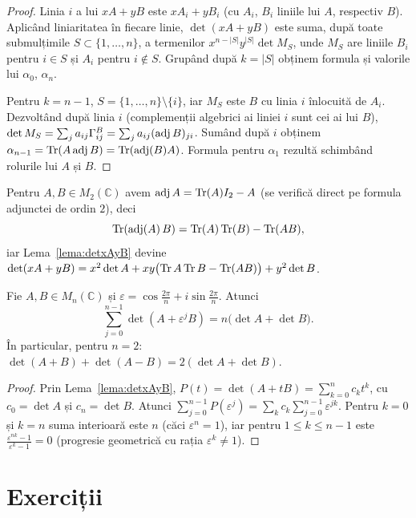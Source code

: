 \begin{proof}
Linia $i$ a lui $xA+yB$ este $xA_i+yB_i$ (cu $A_i$, $B_i$ liniile lui $A$, respectiv $B$). Aplicând liniaritatea în fiecare linie, $\det(xA+yB)$ este suma, după toate submulțimile $S\subset\{1,\dots,n\}$, a termenilor $x^{n-|S|}y^{|S|}\det M_S$, unde $M_S$ are liniile $B_i$ pentru $i\in S$ și $A_i$ pentru $i\notin S$. Grupând după $k=|S|$ obținem formula și valorile lui $\alpha_0$, $\alpha_n$.

Pentru $k=n-1$, $S=\{1,\dots,n\}\setminus\{i\}$, iar $M_S$ este $B$ cu linia $i$ înlocuită de $A_i$. Dezvoltând după linia $i$ (complemenții algebrici ai liniei $i$ sunt cei ai lui $B$), $\det M_S=\sum_ja_{ij}\Gamma^B_{ij}=\sum_j a_{ij}(\operatorname{adj} B)_{ji}$. Sumând după $i$ obținem $\alpha_{n-1}=\operatorname{Tr}(A\operatorname{adj} B)=\operatorname{Tr}(\operatorname{adj}(B)A)$. Formula pentru $\alpha_1$ rezultă schimbând rolurile lui $A$ și $B$.
\end{proof}

\begin{observatie}
Pentru $A,B\in M_2(\mathbb{C})$ avem $\operatorname{adj} A=\operatorname{Tr}(A)I_2-A$ (se verifică direct pe formula adjunctei de ordin $2$), deci
\begin{equation}\label{eq:trace-adj-2x2}
\operatorname{Tr}(\operatorname{adj}(A)\,B)=\operatorname{Tr}(A)\operatorname{Tr}(B)-\operatorname{Tr}(AB),
\end{equation}
iar Lema~\ref{lema:detxAyB} devine $\det(xA+yB)=x^2\det A+xy\bigl(\operatorname{Tr} A\operatorname{Tr} B-\operatorname{Tr}(AB)\bigr)+y^2\det B$.
\end{observatie}

\begin{lema}\label{lema:sumaradacini}
Fie $A,B\in M_n(\mathbb{C})$ și $\varepsilon=\cos\frac{2\pi}n+i\sin\frac{2\pi}n$. Atunci
\[
\sum_{j=0}^{n-1}\det(A+\varepsilon^jB)=n\bigl(\det A+\det B\bigr).
\]
În particular, pentru $n=2$: $\det(A+B)+\det(A-B)=2(\det A+\det B)$.
\end{lema}

\begin{proof}
Prin Lema~\ref{lema:detxAyB}, $P(t)=\det(A+tB)=\sum_{k=0}^nc_kt^k$, cu $c_0=\det A$ și $c_n=\det B$. Atunci $\sum_{j=0}^{n-1}P(\varepsilon^j)=\sum_kc_k\sum_{j=0}^{n-1}\varepsilon^{jk}$. Pentru $k=0$ și $k=n$ suma interioară este $n$ (căci $\varepsilon^n=1$), iar pentru $1\le k\le n-1$ este $\frac{\varepsilon^{nk}-1}{\varepsilon^k-1}=0$ (progresie geometrică cu rația $\varepsilon^k\neq1$).
\end{proof}

\section{Exerciții}

